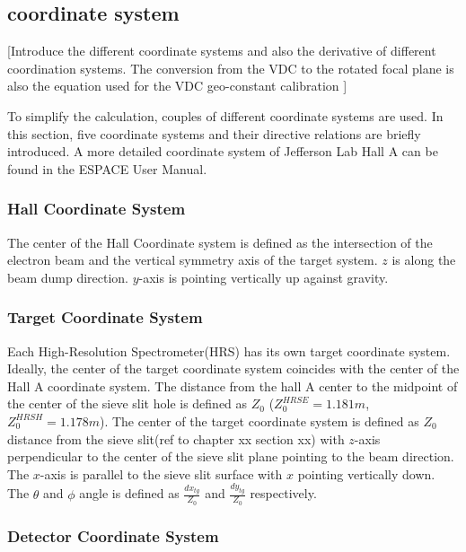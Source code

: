 \subsection{coordinate system}

[Introduce the different coordinate systems and also the derivative of different coordination systems. The conversion from the VDC to the rotated focal plane is also the equation used for the VDC geo-constant calibration ]


To simplify the calculation, couples of different coordinate systems are used. In this section, five coordinate systems and their directive relations are briefly introduced. A more detailed coordinate system of Jefferson Lab Hall A can be found in the ESPACE User Manual\cite{espace2002manual}.  

\subsubsection{Hall Coordinate System}
The center of the Hall Coordinate system is defined as the intersection of the electron beam and the vertical symmetry axis of the target system. $z$ is along the beam dump direction. $y$-axis is pointing vertically up against gravity.


\subsubsection{Target Coordinate System}

Each High-Resolution Spectrometer(HRS) has its own target coordinate system. Ideally, the center of the target coordinate system coincides with the center of the Hall A coordinate system. The distance from the hall A center to the midpoint of the center of the sieve slit hole is defined as $Z_0$ ($Z^{HRSE}_0 = 1.181 m$, $Z^{HRSH}_0 = 1.178 m$). The center of the target coordinate system is defined as $Z_0$ distance from the sieve slit(ref to chapter xx section xx) with $z$-axis perpendicular to the center of the sieve slit plane pointing to the beam direction. The $x$-axis is parallel to the sieve slit surface with $x$ pointing vertically down. The $\theta$ and $\phi$ angle is defined as $\frac{dx_{tg}}{Z_0}$ and $\frac{dy_{tg}}{Z_0}$ respectively.



\subsubsection{Detector Coordinate System}

